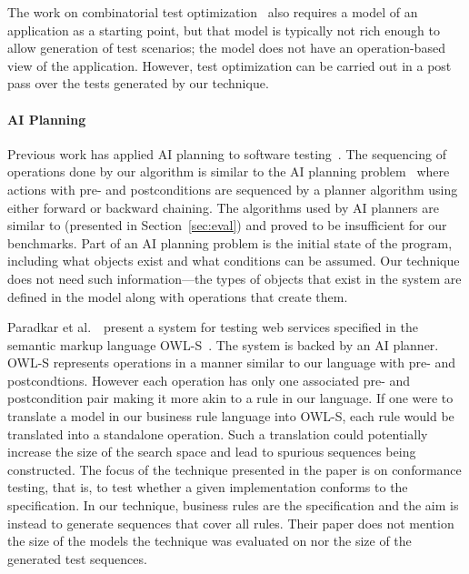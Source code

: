 The work on combinatorial test optimization~\cite{segall2012} also requires a model 
of an application as a starting point, but that model is typically not rich
enough to allow generation of test scenarios; the model does not have an operation-based
view of the application.   However, test optimization 
can be carried out in a post pass over the tests generated by our technique.

\paragraph*{AI Planning}Previous work has applied AI planning to software
testing~\cite{Scheetz99ai,Howe97testcase}. The sequencing of
operations done by our algorithm is similar to the AI planning
problem~\cite{Weld94} where actions with pre- and postconditions are sequenced
by a planner algorithm using either forward or backward chaining. The
algorithms used by AI planners are similar to \exhaust{}
(presented in Section~\ref{sec:eval}) and proved to be insufficient for our
benchmarks. Part of an AI planning problem is the initial state of the program,
including what objects exist and what conditions can be
assumed. Our technique does not need such information---the types of objects that
exist in the system are defined in the model along with operations
that create them. 

Paradkar et al.~\cite{conf/icws/ParadkarSWJOSL07}\ present a system
for testing web services specified in the semantic markup language
OWL-S~\cite{owls}. The system is backed by an AI planner. OWL-S represents
operations in a manner similar to our language with pre- and
postcondtions. However each operation has only one associated pre- and
postcondition pair making it more akin to a rule in our language. If
one were to translate a model in our business rule language into
OWL-S, each rule would be translated into a standalone operation. Such
a translation could potentially increase the size of the search space
and lead to spurious sequences being constructed. The focus of the
technique presented in the paper is on conformance testing, that is,
to test whether a given implementation conforms to the specification. In
our technique, business rules are the specification and the aim is
instead to generate sequences that cover all rules. Their paper does not
mention the size of the models the technique was evaluated on nor the
size of the generated test sequences.

